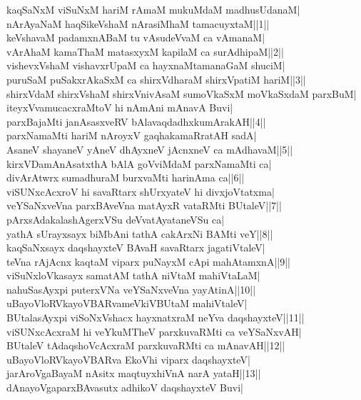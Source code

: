 \documentclass{article}
\begin{document}
kaqSaNxM viSuNxM hariM rAmaM mukuMdaM madhusUdanaM|\\
nArAyaNaM haqSikeVshaM nArasiMhaM tamacuyxtaM||1||\\
keVshavaM padamxnABaM tu vAsudeVvaM ca vAmanaM|\\
vArAhaM kamaThaM matasxyxM kapilaM ca surAdhipaM||2||\\
vishevxVshaM vishavxrUpaM ca hayxnaMtamanaGaM shuciM|\\
puruSaM puSakxrAkaSxM ca shirxVdharaM shirxVpatiM hariM||3||\\
shirxVdaM shirxVshaM shirxVnivAsaM sumoVkaSxM moVkaSxdaM parxBuM|\\
iteyxVvamucacxraMtoV hi nAmAni mAnavA Buvi|\\
parxBajaMti janAsasxveRV bAlavaqdadhxkumArakAH||4||\\
parxNamaMti hariM nAroyxV gaqhakamaRratAH sadA|\\
AsaneV shayaneV yAneV dhAyxneV jAcnxneV ca mAdhavaM||5||\\
kirxVDamAnAsatxthA bAlA goVviMdaM parxNamaMti ca|\\
divArAtwrx sumadhuraM burxvaMti harinAma ca||6||\\
viSUNxcAcxroV hi savaRtarx shUrxyateV hi divxjoVtatxma|\\
veYSaNxveVna parxBAveVna matAyxR vataRMti BUtaleV||7||\\
pArxsAdakalashAgerxVSu deVvatAyataneVSu ca|\\
yathA sUrayxsayx biMbAni tathA cakArxNi BAMti veY||8||\\
kaqSaNxsayx daqshayxteV BAvaH savaRtarx jagatiVtaleV|\\
teVna rAjAcnx kaqtaM viparx puNayxM cApi mahAtamxnA||9||\\
viSuNxloVkasayx samatAM tathA niVtaM mahiVtaLaM|\\
nahuSasAyxpi puterxVNa veYSaNxveVna yayAtinA||10||\\
uBayoVloRVkayoVBARvameVkiVBUtaM mahiVtaleV|\\
BUtalasAyxpi viSoNxVshacx hayxnatxraM neYva daqshayxteV||11||\\
viSUNxcAcxraM hi veYkuMTheV parxkuvaRMti ca veYSaNxvAH|\\
BUtaleV tAdaqshoVcAcxraM parxkuvaRMti ca mAnavAH||12||\\
uBayoVloRVkayoVBARva EkoVhi viparx daqshayxteV|\\
jarAroVgaBayaM nAsitx maqtuyxhiVnA narA yataH||13||\\
dAnayoVgaparxBAvasutx adhikoV daqshayxteV Buvi|\\
\end{document}

